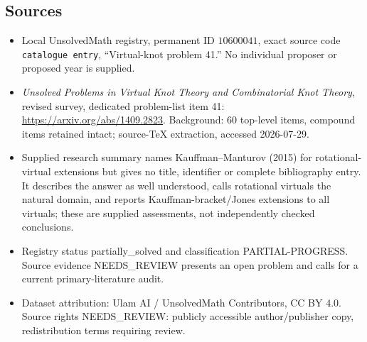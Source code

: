 \documentclass[11pt]{article}
\begin{document}
\subsection{Sources}
\begin{itemize}
\item Local UnsolvedMath registry, permanent ID \(10600041\), exact source code \texttt{catalogue entry}, ``Virtual-knot problem 41.'' No individual proposer or proposed year is supplied.
\item \emph{Unsolved Problems in Virtual Knot Theory and Combinatorial Knot Theory}, revised survey, dedicated problem-list item 41: \url{https://arxiv.org/abs/1409.2823}. Background: 60 top-level items, compound items retained intact; source-TeX extraction, accessed 2026-07-29.
\item Supplied research summary names Kauffman--Manturov (2015) for rotational-virtual extensions but gives no title, identifier or complete bibliography entry. It describes the answer as well understood, calls rotational virtuals the natural domain, and reports Kauffman-bracket/Jones extensions to all virtuals; these are supplied assessments, not independently checked conclusions.
\item Registry status partially\_solved and classification PARTIAL-PROGRESS. Source evidence NEEDS\_REVIEW presents an open problem and calls for a current primary-literature audit.
\item Dataset attribution: Ulam AI / UnsolvedMath Contributors, CC BY 4.0. Source rights NEEDS\_REVIEW: publicly accessible author/publisher copy, redistribution terms requiring review.
\end{itemize}
\end{document}
